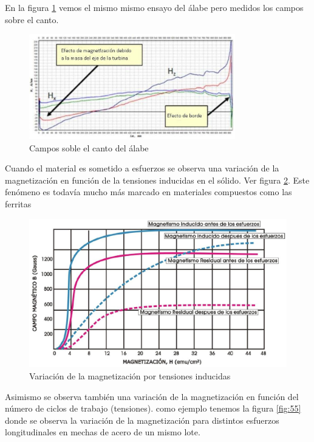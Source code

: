 En la figura \ref{fig:53} vemos el mismo mismo ensayo del álabe pero medidos los campos sobre el canto.

\begin{figure}[H]
    \centering
    \includegraphics[width=0.8\textwidth]{./Figures/fig53}
	\caption{Campos soble el canto del álabe}
	\label{fig:53}
\end{figure}

Cuando el material es sometido a esfuerzos se observa una variación de la magnetización en función de la tensiones inducidas en el sólido. Ver figura \ref{fig:54}. Este fenómeno es todavía mucho más marcado en materiales compuestos como las ferritas 

\begin{figure}[H]
    \centering
    \includegraphics[width=1.0\textwidth]{./Figures/fig54}
	\caption{Variación de la magnetización por tensiones inducidas}
	\label{fig:54}
\end{figure}


Asimismo se observa también una variación de la magnetización en función del número de ciclos de trabajo (tensiones). como ejemplo tenemos la figura \ref{fig:55} donde se observa la variación de la magnetización para distintos esfuerzos longitudinales en mechas de acero de un mismo lote.

